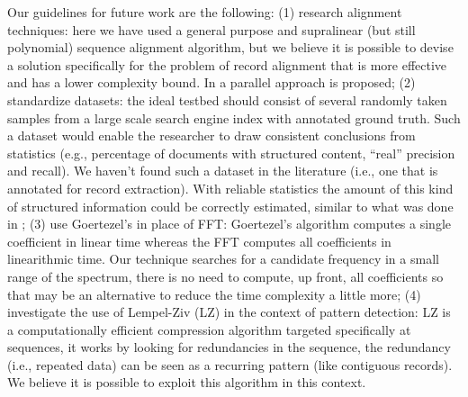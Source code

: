 Our guidelines for future work are the following:
  (1) research alignment techniques: here we have used a general purpose and
  supralinear (but still polynomial) sequence alignment algorithm, but we
  believe it is possible to devise a solution specifically for the problem of
  record alignment that is more effective and has a lower complexity bound. In
  \cite{gfrerer2017parallel} a parallel approach is proposed;
  (2) standardize datasets: the ideal testbed should consist of several
  randomly taken samples from a large scale search engine index with annotated
  ground truth.
  Such a dataset would enable the researcher to draw consistent conclusions
  from statistics (e.g., percentage of documents with structured content,
  ``real'' precision and recall). We haven't found such a dataset in the
  literature (i.e., one that is annotated for record extraction). With reliable
  statistics the amount of this kind of structured information could be
  correctly estimated, similar to what was done in \cite{webtables2008};
  (3) use Goertezel's \cite{goertzel1958algorithm} in place of FFT:
  Goertezel's algorithm computes a single coefficient in linear time whereas the
  FFT computes all coefficients in linearithmic time. Our technique searches for a
  candidate frequency in a small range of the spectrum, there is no need to
  compute, up front, all coefficients so that may be an alternative to reduce
  the time complexity a little more;
  (4) investigate the use of Lempel-Ziv\cite{ziv1977universal} (LZ) in the
  context of pattern detection: LZ is a computationally efficient compression
  algorithm targeted specifically at sequences, it works by looking for
  redundancies in the sequence, the redundancy (i.e., repeated data) can be seen
  as a recurring pattern (like contiguous records). We believe it is
  possible to exploit this algorithm in this context.



